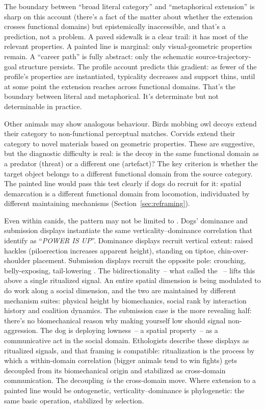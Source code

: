 \documentclass[12pt]{article}
\newcommand{\metaphor}[1]{\enquote{\textit{\MakeUppercase{#1}}}}
\begin{document}
The boundary between \enquote{broad literal category} and \enquote{metaphorical extension} is sharp on this account (there's a fact of the matter about whether the extension crosses functional domains) but epistemically inaccessible, and that's a prediction, not a problem. A paved sidewalk is a clear trail: it has most of the relevant properties. A painted line is marginal: only visual-geometric properties remain. A \enquote{career path} is fully abstract: only the schematic source-trajectory-goal structure persists. The profile account predicts this gradient: as fewer of the profile's properties are instantiated, typicality decreases and support thins, until at some point the extension reaches across functional domains. That's the boundary between literal and metaphorical. It's determinate but not determinable in practice.

Other animals may show analogous behaviour. Birds mobbing owl decoys extend their  category to non-functional perceptual matches. Corvids extend their  category to novel materials based on geometric properties. These are suggestive, but the diagnostic difficulty is real: is the decoy in the same functional domain as a predator (threat) or a different one (artefact)? The key criterion is whether the target object belongs to a different functional domain from the source category. The painted line would pass this test clearly if dogs do recruit  for it: spatial demarcation is a different functional domain from locomotion, individuated by different maintaining mechanisms (Section~\ref{sec:reframing}).

Even within canids, the pattern may not be limited to . Dogs' dominance and submission displays instantiate the same verticality--dominance correlation that \textcite{lakoff1980} identify as \metaphor{power is up}. Dominance displays recruit vertical extent: raised hackles (piloerection increases apparent height), standing on tiptoe, chin-over-shoulder placement. Submission displays recruit the opposite pole: crouching, belly-exposing, tail-lowering \citep{schenkel1967}. The bidirectionality~-- what \textcite{darwin1872} called the ~-- lifts this above a single ritualized signal. An entire spatial dimension is being modulated to do work along a social dimension, and the two are maintained by different mechanism suites: physical height by biomechanics, social rank by interaction history and coalition dynamics. The submission case is the more revealing half: there's no biomechanical reason why making yourself low should signal non-aggression. The dog is deploying lowness~-- a spatial property~-- as a communicative act in the social domain. Ethologists describe these displays as ritualized signals, and that framing is compatible: ritualization is the process by which a within-domain correlation (bigger animals tend to win fights) gets decoupled from its biomechanical origin and stabilized as cross-domain communication. The decoupling \emph{is} the cross-domain move. Where  extension to a painted line would be ontogenetic, verticality--dominance is phylogenetic: the same basic operation, stabilized by selection.
\end{document}

